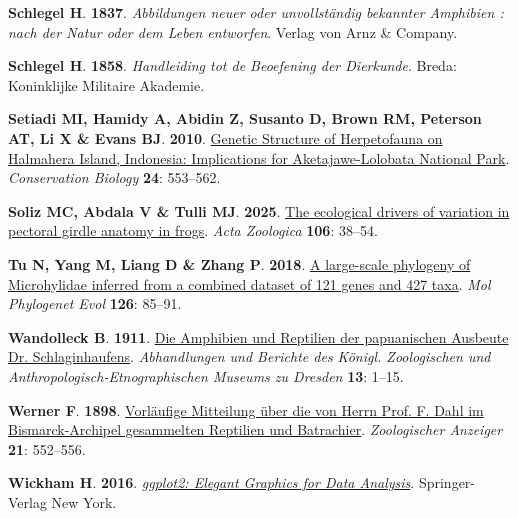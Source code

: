 \documentclass[
  letterpaper,
  DIV=11,
  numbers=noendperiod]{scrartcl}
\newlength{\cslhangindent}
\newenvironment{CSLReferences}[2] %
 {\begin{list}{}{%
  \setlength{\itemindent}{0pt}
  \setlength{\leftmargin}{0pt}
  \setlength{\parsep}{0pt}
  \ifodd #1
   \setlength{\leftmargin}{\cslhangindent}
   \setlength{\itemindent}{-1\cslhangindent}
  \fi
  \setlength{\itemsep}{#2\baselineskip}}}
 {\end{list}}
\begin{document}
\begin{CSLReferences}{0}{1}
\textbf{\textbf{Schlegel H}}. \textbf{1837}. \emph{{Abbildungen neuer
oder unvollst{ä}ndig bekannter Amphibien : nach der Natur oder dem Leben
entworfen}}. Verlag von Arnz \& Company.

\textbf{\textbf{Schlegel H}}. \textbf{1858}. \emph{{Handleiding tot de
Beoefening der Dierkunde}}. Breda: Koninklijke Militaire Akademie.

\textbf{\textbf{Setiadi MI}, \textbf{Hamidy A}, \textbf{Abidin Z},
\textbf{Susanto D}, \textbf{Brown RM}, \textbf{Peterson AT}, \textbf{Li
X} \& \textbf{Evans BJ}}. \textbf{2010}.
\href{https://doi.org/10.1111/j.1523-1739.2009.01384.x}{{Genetic
Structure of Herpetofauna on Halmahera Island, Indonesia: Implications
for Aketajawe-Lolobata National Park}}. \emph{Conservation Biology}
\textbf{24}: 553--562.

\textbf{\textbf{Soliz MC}, \textbf{Abdala V} \& \textbf{Tulli MJ}}.
\textbf{2025}. \href{https://doi.org/10.1111/azo.12494}{{The ecological
drivers of variation in pectoral girdle anatomy in frogs}}. \emph{Acta
Zoologica} \textbf{106}: 38--54.

\textbf{\textbf{Tu N}, \textbf{Yang M}, \textbf{Liang D} \&
\textbf{Zhang P}}. \textbf{2018}.
\href{https://doi.org/10.1016/j.ympev.2018.03.036}{{A large-scale
phylogeny of Microhylidae inferred from a combined dataset of 121 genes
and 427 taxa}}. \emph{Mol Phylogenet Evol} \textbf{126}: 85--91.

\textbf{\textbf{Wandolleck B}}. \textbf{1911}.
\href{https://www.biodiversitylibrary.org/part/263989}{{Die Amphibien
und Reptilien der papuanischen Ausbeute Dr. Schlaginhaufens}}.
\emph{Abhandlungen und Berichte des K{ö}nigl. Zoologischen und
Anthropologisch-Etnographischen Museums zu Dresden} \textbf{13}: 1--15.

\textbf{\textbf{Werner F}}. \textbf{1898}.
\href{https://www.biodiversitylibrary.org/part/28256}{{Vorl{ä}ufige
Mitteilung {ü}ber die von Herrn Prof. F. Dahl im Bismarck-Archipel
gesammelten Reptilien und Batrachier}}. \emph{Zoologischer Anzeiger}
\textbf{21}: 552--556.

\textbf{\textbf{Wickham H}}. \textbf{2016}.
\emph{\href{https://ggplot2.tidyverse.org}{{ggplot2: Elegant Graphics
for Data Analysis}}}. Springer-Verlag New York.


\end{CSLReferences}
\end{document}
